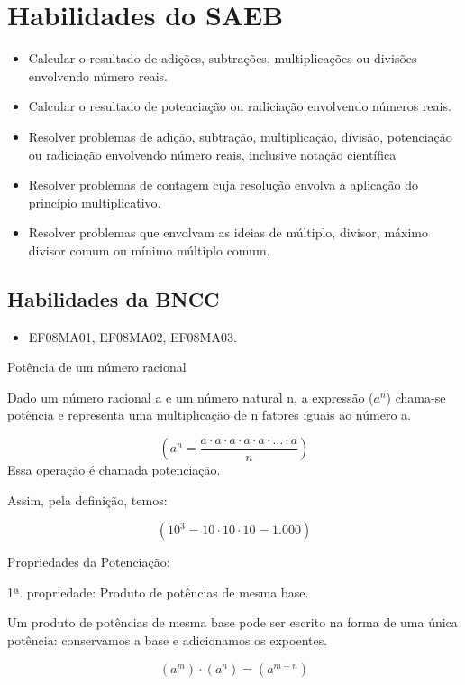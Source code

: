 \section{Habilidades do SAEB}

\begin{itemize}
  \item Calcular o resultado de adições, subtrações,
multiplicações ou divisões envolvendo número reais.
\item
  Calcular o resultado de potenciação ou radiciação envolvendo números
  reais.
\item
  Resolver problemas de adição, subtração, multiplicação, divisão,
  potenciação ou radiciação envolvendo número reais, inclusive notação
  científica
\item
  Resolver problemas de contagem cuja resolução envolva a aplicação do
  princípio multiplicativo.
\item
  Resolver problemas que envolvam as ideias de múltiplo, divisor, máximo
  divisor comum ou mínimo múltiplo comum.
\end{itemize}

\subsection{Habilidades da BNCC}

\begin{itemize}
\item EF08MA01, EF08MA02, EF08MA03.
\end{itemize}

Potência de um número racional

Dado um número racional a e um número natural n, a expressão ($a^n$)
chama-se potência e representa uma multiplicação de n fatores iguais ao
número a.

$$(a^n = \frac{a \cdot a \cdot a \cdot a \cdot a \cdot \ldots \cdot a}{n})$$
Essa operação é chamada potenciação.

Assim, pela definição, temos:

$$(10^3 = 10 \cdot 10 \cdot 10 = 1.000)$$

Propriedades da Potenciação:

1ª. propriedade: Produto de potências de mesma base.

Um produto de potências de mesma base pode ser escrito na forma de uma
única potência: conservamos a base e adicionamos os expoentes.

$$(a^m) \cdot (a^n) = (a^{m+n})$$

